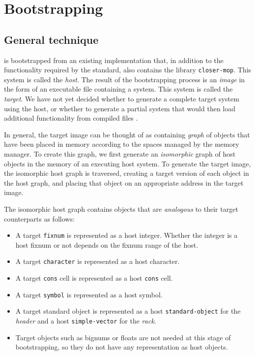 \chapter{Bootstrapping}

\section{General technique}

\sysname{} is bootstrapped from an existing \commonlisp{}
implementation that, in addition to the functionality required by the
standard, also contains the library \texttt{closer-mop}.  This
\commonlisp{} system is called the \emph{host}.  The result of the
bootstrapping process is an \emph{image} in the form of an executable
file containing a \sysname{} system.  This system is called the
\emph{target}.  We have not yet decided whether to generate a complete
target system using the host, or whether to generate a partial system
that would then load additional functionality from compiled files
.

In general, the target image can be thought of as containing
\emph{graph} of \commonlisp{} objects that have been placed in memory
according to the spaces managed by the memory manager.  To create this
graph, we first generate an \emph{isomorphic} graph of host objects in
the memory of an executing host system.  To generate the target image,
the isomorphic host graph is traversed, creating a target version of
each object in the host graph, and placing that object on an
appropriate address in the target image.

The isomorphic host graph contains objects that are \emph{analogous}
to their target counterparts as follows:

\begin{itemize}
\item A target \texttt{fixnum} is represented as a host integer.
  Whether the integer is a host fixnum or not depends on the fixnum
  range of the host.
\item A target \texttt{character} is represented as a host character.
\item A target \texttt{cons} cell is represented as a host
  \texttt{cons} cell.
\item A target \texttt{symbol} is represented as a host symbol.
\item A target standard object is represented as a host
  \texttt{standard-object} for the \emph{header} and a host
  \texttt{simple-vector} for the \emph{rack}.
\item Target objects such as bignums or floats are not needed at this
  stage of bootstrapping, so they do not have any representation as
  host objects.
\end{itemize}

